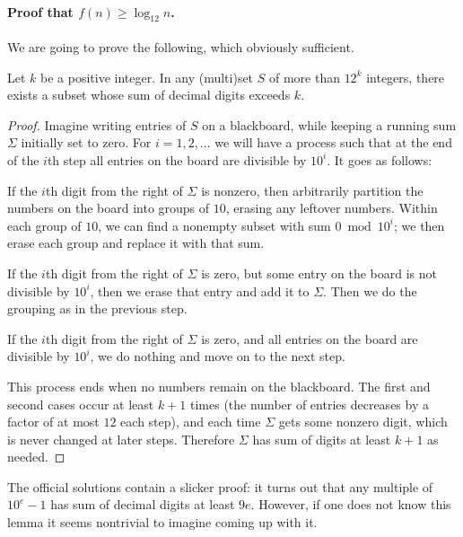 \documentclass[11pt]{scrartcl}
\begin{document}
\paragraph{Proof that $f(n) \ge \log_{12} n$.}
We are going to prove the following, which obviously sufficient.
\begin{claim*}
  Let $k$ be a positive integer.
  In any (multi)set $S$ of more than $12^k$ integers,
  there exists a subset whose sum of decimal digits exceeds $k$.
\end{claim*}
\begin{proof}
  Imagine writing entries of $S$ on a blackboard,
  while keeping a running sum $\Sigma$ initially set to zero.
  For $i = 1, 2, \dots$ we will have a process such that
  at the end of the $i$th step all entries on the board
  are divisible by $10^i$.
  It goes as follows:
  \begin{itemize}
    \ii If the $i$th digit from the right of $\Sigma$ is nonzero,
    then arbitrarily partition the numbers on the board
    into groups of $10$, erasing any leftover numbers.
    Within each group of $10$, we can find
    a nonempty subset with sum $0 \bmod{10^i}$;
    we then erase each group and replace it with that sum.

    \ii If the $i$th digit from the right of $\Sigma$ is zero,
    but some entry on the board is not divisible by $10^i$,
    then we erase that entry and add it to $\Sigma$.
    Then we do the grouping as in the previous step.

    \ii If the $i$th digit from the right of $\Sigma$ is zero,
    and all entries on the board are divisible by $10^i$,
    we do nothing and move on to the next step.
  \end{itemize}
  This process ends when no numbers remain on the blackboard.
  The first and second cases occur at least $k+1$ times
  (the number of entries decreases by a factor of at most $12$ each step),
  and each time $\Sigma$ gets some nonzero digit,
  which is never changed at later steps.
  Therefore $\Sigma$ has sum of digits at least $k+1$ as needed.
\end{proof}

\begin{remark*}
  The official solutions contain a slicker proof:
  it turns out that any multiple of $10^e-1$ has
  sum of decimal digits at least $9e$.
  However, if one does not know this lemma it seems
  nontrivial to imagine coming up with it.
\end{remark*}
\pagebreak
\end{document}

